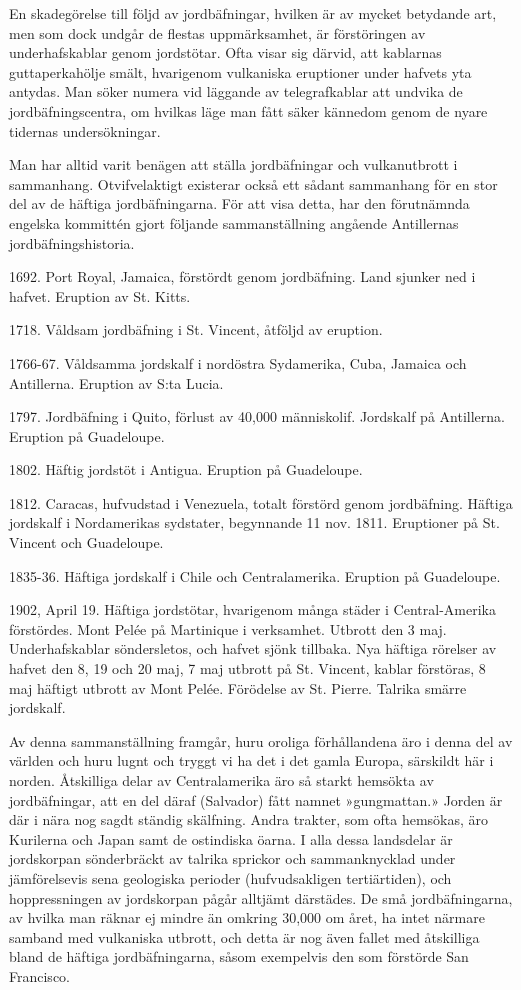 \documentclass[a4paper, 12pt, oneside, swedish]{article}
\begin{document}
En skadegörelse till följd av jordbäfningar, hvilken är av mycket betydande art, men som dock undgår de flestas uppmärksamhet, är förstöringen av underhafskablar genom jordstötar. Ofta visar sig därvid, att kablarnas guttaperkahölje smält, hvarigenom vulkaniska eruptioner under hafvets yta antydas. Man söker numera vid läggande av telegrafkablar att undvika de jordbäfningscentra, om hvilkas läge man fått säker kännedom genom de nyare tidernas undersökningar.

Man har alltid varit benägen att ställa jordbäfningar och vulkanutbrott i sammanhang. Otvifvelaktigt existerar också ett sådant sammanhang för en stor del av de häftiga jordbäfningarna. För att visa detta, har den förutnämnda engelska kommittén gjort följande sammanställning angående Antillernas jordbäfningshistoria.

1692. Port Royal, Jamaica, förstördt genom jordbäfning. Land sjunker ned i hafvet. Eruption av St. Kitts.

1718. Våldsam jordbäfning i St. Vincent, åtföljd av eruption.

1766-67. Våldsamma jordskalf i nordöstra Sydamerika, Cuba, Jamaica och Antillerna. Eruption av S:ta Lucia.

1797. Jordbäfning i Quito, förlust av 40,000 människolif. Jordskalf på Antillerna. Eruption på Guadeloupe.

1802. Häftig jordstöt i Antigua. Eruption på Guadeloupe.

1812. Caracas, hufvudstad i Venezuela, totalt förstörd genom jordbäfning. Häftiga jordskalf i Nordamerikas sydstater, begynnande 11 nov. 1811. Eruptioner på St. Vincent och Guadeloupe.

1835-36. Häftiga jordskalf i Chile och Centralamerika. Eruption på Guadeloupe.

1902, April 19. Häftiga jordstötar, hvarigenom många städer i Central-Amerika förstördes. Mont Pelée på Martinique i verksamhet. Utbrott den 3 maj. Underhafskablar söndersletos, och hafvet sjönk tillbaka. Nya häftiga rörelser av hafvet den 8, 19 och 20 maj, 7 maj utbrott på St. Vincent, kablar förstöras, 8 maj häftigt utbrott av Mont Pelée. Förödelse av St. Pierre. Talrika smärre jordskalf.

Av denna sammanställning framgår, huru oroliga förhållandena äro i denna del av världen och huru lugnt och tryggt vi ha det i det gamla Europa, särskildt här i norden. Åtskilliga delar av Centralamerika äro så starkt hemsökta av jordbäfningar, att en del däraf (Salvador) fått namnet »gungmattan.» Jorden är där i nära nog sagdt ständig skälfning. Andra trakter, som ofta hemsökas, äro Kurilerna och Japan samt de ostindiska öarna. I alla dessa landsdelar är jordskorpan sönderbräckt av talrika sprickor och sammanknycklad under jämförelsevis sena geologiska perioder (hufvudsakligen tertiärtiden), och hoppressningen av jordskorpan pågår alltjämt därstädes. De små jordbäfningarna, av hvilka man räknar ej mindre än omkring 30,000 om året, ha intet närmare samband med vulkaniska utbrott, och detta är nog även fallet med åtskilliga bland de häftiga jordbäfningarna, såsom exempelvis den som förstörde San Francisco.
\end{document}
